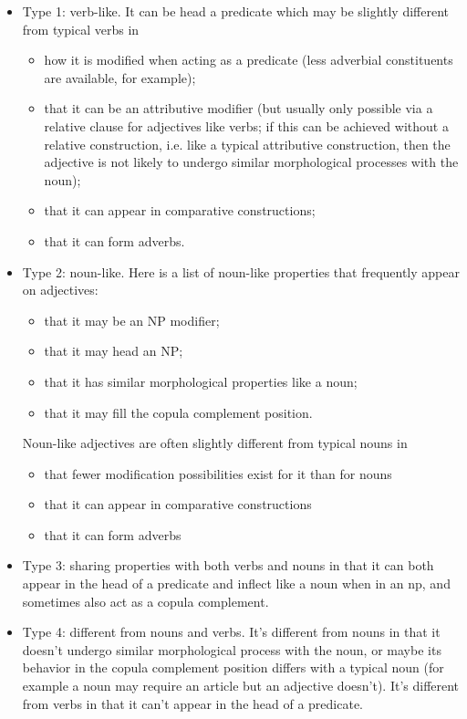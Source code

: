 \documentclass[UTF8, a4paper, oneside, scheme=plain]{ctexart}
\begin{document}
\begin{itemize}
    \item Type 1: verb-like. It can be head a predicate
    which may be slightly different from typical verbs in
    \begin{itemize}
        \item how it is modified when acting as a predicate 
        (less adverbial constituents are available, for example);
        \item that it can be an attributive modifier 
        (but usually only possible via a relative clause for adjectives like verbs; 
        if this can be achieved without a relative construction, i.e. like a typical attributive construction,
        then the adjective is not likely to undergo similar morphological processes with the noun);
        \item that it can appear in comparative constructions;
        \item that it can form adverbs.
    \end{itemize}
    \item Type 2: noun-like. Here is a list of noun-like properties that frequently appear on adjectives:
    \begin{itemize}
        \item that it may be an NP modifier;
        \item that it may head an NP;
        \item that it has similar morphological properties like a noun;
        \item that it may fill the copula complement position.
    \end{itemize}
    Noun-like adjectives are often slightly different from typical nouns in
    \begin{itemize}
        \item that fewer modification possibilities exist for it than for nouns
        \item that it can appear in comparative constructions
        \item that it can form adverbs
    \end{itemize}
    \item Type 3: sharing properties with both verbs and nouns
    in that it can both appear in the head of a predicate and
    inflect like a noun when in an \ac{np}, 
    and sometimes also act as a copula complement.
    \item Type 4: different from nouns and verbs.
    It's different from nouns in that
    it doesn't undergo similar morphological process with the noun, or maybe 
    its behavior in the copula complement position differs with a typical noun 
    (for example a noun may require an article but an adjective doesn't).
    It's different from verbs in that
    it can't appear in the head of a predicate.
\end{itemize}
\end{document}
